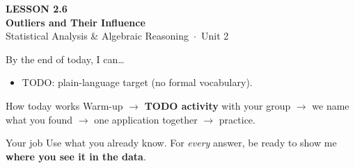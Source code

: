 \documentclass[aspectratio=169, 11pt]{beamer}
\begin{document}
{
\begin{frame}[plain]
  \vspace{2.8cm}\hspace{0.55cm}%
  \begin{minipage}{0.9\textwidth}
    {\color{goldacc}\bfseries\small LESSON 2.6}\\[0.5cm]
    {\color{white}\bfseries\LARGE Outliers and Their Influence}\\[1.2cm]
    {\color{frostmid}\small Statistical Analysis \& Algebraic Reasoning~$\cdot$~Unit 2}
  \end{minipage}
\end{frame}
}

\newcommand{\redink}[1]{{\color{redacc}\bfseries #1}}

\begin{frame}[t, plain]
  By the end of today, I can\ldots
  \begin{itemize}\setlength{\itemsep}{6pt}
    \item TODO: plain-language target (no formal vocabulary).
  \end{itemize}
  \begin{block}{How today works}
    Warm-up $\to$ \textbf{TODO activity} with your group $\to$ we name what you found $\to$
    one application together $\to$ practice.
  \end{block}
\end{frame}

\begin{frame}[t, plain]
\end{frame}

\begin{frame}[t, plain]
  \begin{block}{Your job}
    Use what you already know. For \emph{every} answer, be ready to show me
    \textbf{where you see it in the data}.
  \end{block}
\end{frame}
\end{document}
